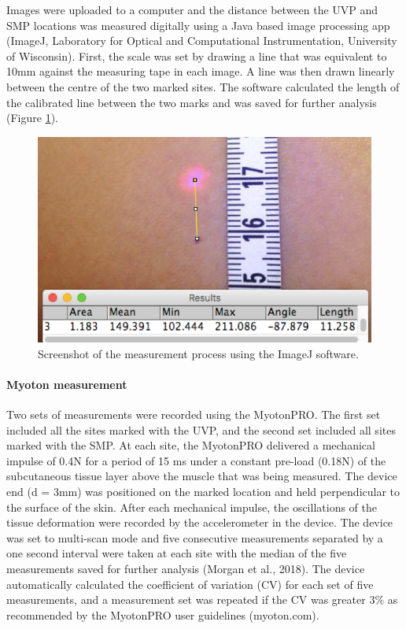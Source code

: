 \documentclass[man,floatsintext]{apa6}
\let\oldparagraph\paragraph
\renewcommand{\paragraph}[1]{\oldparagraph{#1}\mbox{}}
\begin{document}
Images were uploaded to a computer and the distance between the UVP and SMP locations was measured digitally using a Java based image processing app (ImageJ, Laboratory for Optical and Computational Instrumentation, University of Wisconsin).
First, the scale was set by drawing a line that was equivalent to 10mm against the measuring tape in each image.
A line was then drawn linearly between the centre of the two marked sites.
The software calculated the length of the calibrated line between the two marks and was saved for further analysis (Figure \ref{fig:imagej}).

\begin{figure}[H]

{\centering \includegraphics[width=1\linewidth]{figs/measures/measurement} 

}

\caption{Screenshot of the measurement process using the ImageJ software.}\label{fig:imagej}
\end{figure}

\hypertarget{myoton-measurement}{%
\paragraph{Myoton measurement}\label{myoton-measurement}}

Two sets of measurements were recorded using the MyotonPRO.
The first set included all the sites marked with the UVP, and the second set included all sites marked with the SMP.
At each site, the MyotonPRO delivered a mechanical impulse of 0.4N for a period of 15 ms under a constant pre-load (0.18N) of the subcutaneous tissue layer above the muscle that was being measured.
The device end (d = 3mm) was positioned on the marked location and held perpendicular to the surface of the skin.
After each mechanical impulse, the oscillations of the tissue deformation were recorded by the accelerometer in the device.
The device was set to multi-scan mode and five consecutive measurements separated by a one second interval were taken at each site with the median of the five measurements saved for further analysis (Morgan et al., 2018).
The device automatically calculated the coefficient of variation (CV) for each set of five measurements, and a measurement set was repeated if the CV was greater 3\% as recommended by the MyotonPRO user guidelines (myoton.com).
\end{document}
